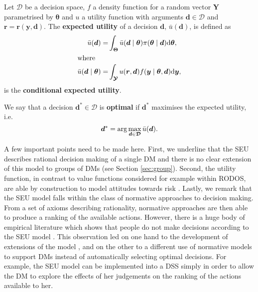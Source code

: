 \begin{definition}
Let $\bm{\mathcal{D}}$ be a decision space, $f$ a density function for a random vector $\bm{Y}$ parametrised by $\bm{\theta}$ and $u$ a utility function with arguments $\bm{d}\in \bm{\mathcal{D}}$ and $\bm{r}=\bm{r}(\bm{y},\bm{d})$. The \textbf{expected utility} of a decision $\bm{d}$, $\bar{u}(\bm{d})$, is defined as
\begin{align}
\label{eq:expectedut}
\bar{u}(\bm{d})=&\int_{\bm{\Theta}}\bar{u}(\bm{d}\;|\;\bm{\theta})\pi(\bm{\theta}\;|\;\bm{d})\dr \bm{\theta},\\
\intertext{where}
\label{eq:expectedcondut}
\bar{u}(\bm{d}\;|\;\bm{\theta})=&\int_{\bm{\MY}}u(\bm{r},\bm{d})f(\y\;|\;\bm{\theta},\bm{d})\dr\y,
\end{align}
is the \textbf{conditional expected utility}.
\end{definition}
\begin{definition}
We say that a decision $\bm{d}^*\in\bm{\mathcal{D}}$ is \textbf{optimal} if $\bm{d}^{*}$ maximises the expected utility, i.e.
\begin{equation}
\label{eq:maxut}
\bm{d}^*=\arg\max_{\bm{d}\in\bm{\De}}\bar{u}(\bm{d}).
\end{equation}
\end{definition}

A few important points need to be made here. First, we underline that the SEU describes rational decision making of a single DM and there is no clear extension of this model to groups of DMs (see Section \ref{sec:group}). Second, the utility function, in contrast to value functions considered for example within RODOS, are able by construction  to model attitudes towards risk \citep[see e.g.][]{Keeney1993a}. Lastly, we remark that the SEU model falls within the class of normative approaches to decision making. From a set of axioms describing rationality, normative approaches are then able to produce a ranking of the available actions. However, there is a huge body of empirical literature which shows that people do not make decisions according to the SEU model \citep{Tversky1974}. This observation led on one hand to the development of extensions of the model \citep[e.g. prospect theory,][]{Kahneman1979}, and on the other to a different use of normative models to support DMs instead of automatically selecting optimal decisions. For example, the SEU model can be implemented into a DSS simply in order to allow the DM to explore the effects of her judgements on the ranking of the actions available to her.

